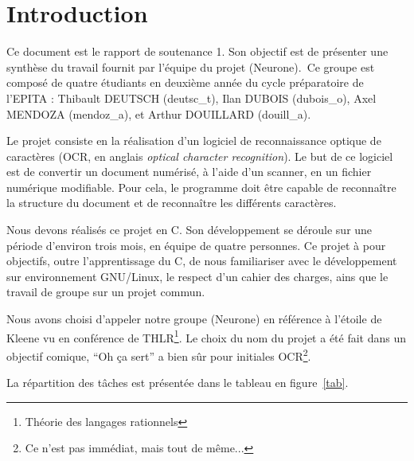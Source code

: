 \documentclass[11pt]{report}
\begin{document}
\newpage
{}

\chapter{Introduction}

Ce document est le rapport de soutenance 1. Son objectif est de présenter une synthèse du travail fournit par l’équipe du projet (Neurone)\up{*}.\ Ce groupe est composé de quatre étudiants en deuxième année du cycle préparatoire de l’EPITA : Thibault DEUTSCH (deutsc\_t), Ilan DUBOIS (dubois\_o),  Axel MENDOZA (mendoz\_a), et Arthur DOUILLARD (douill\_a).

Le projet consiste en la réalisation d’un logiciel de reconnaissance optique de caractères (OCR, en anglais \emph{optical character recognition}). Le but de ce logiciel est de convertir un document numérisé, à l'aide d'un scanner, en un fichier numérique modifiable. Pour cela, le programme doit être capable de reconnaître la structure du document et de reconnaître les différents caractères.

Nous devons réalisés ce projet en C. Son développement se déroule sur une période d’environ trois mois, en équipe de quatre personnes. Ce projet à pour objectifs, outre l'apprentissage du C, de nous familiariser avec le développement sur environnement GNU/Linux, le respect d'un cahier des charges, ains que le travail de groupe sur un projet commun.

Nous avons choisi d’appeler notre groupe (Neurone)\up{*} en référence à l’étoile de Kleene vu en conférence de THLR\footnote{Théorie des langages rationnels}. Le choix du nom du projet a été fait dans un objectif comique, ``Oh ça sert'' a bien sûr pour initiales OCR\footnote{Ce n'est pas immédiat, mais tout de même...}.

La répartition des tâches est présentée dans le tableau en figure~\ref{tab}.

\end{document}
